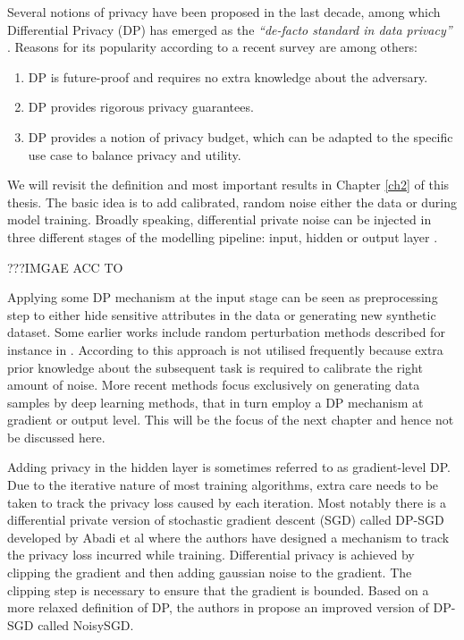 Several notions of privacy have been proposed in the last decade, among which Differential Privacy (DP) has emerged as the \textit{``de-facto standard in data privacy''} \parencite{kim2021survey}. Reasons for its popularity according to a recent survey \parencite{surv_dp2021} are among others:

\begin{enumerate}
    \item DP is future-proof and requires no extra knowledge about the adversary.
    \item DP provides rigorous privacy guarantees.
    \item DP provides a notion of privacy budget, which can be adapted to the specific use case to balance privacy and utility.
\end{enumerate}

We will revisit the definition and most important results in Chapter \ref{ch2} of this thesis. The basic idea is to add calibrated, random noise either the data or during model training. Broadly speaking, differential private noise can be injected in three different stages of the modelling pipeline: input, hidden or output layer \parencite[cf.][]{zhao2019differential}. 

???IMGAE ACC TO \parencite{wang2023differential}

Applying some DP mechanism at the input stage can be seen as preprocessing step to either hide sensitive attributes in the data or generating new synthetic dataset. Some earlier works include random perturbation methods described for instance in \parencite{input_levelDP,erm_dp_input}. According to \parencite{wang2023differential} this approach is not utilised frequently because extra prior knowledge about the subsequent task is required to calibrate the right amount of noise. More recent methods focus exclusively on generating data samples by deep learning methods, that in turn employ a DP mechanism at gradient or output level. This will be the focus of the next chapter and hence not be discussed here.

Adding privacy in the hidden layer is sometimes referred to as gradient-level DP. Due to the iterative nature of most training algorithms, extra care needs to be taken to track the privacy loss caused by each iteration. Most notably there is a differential private version of stochastic gradient descent (SGD) called DP-SGD developed by Abadi et al \parencite{Abadi_2016} where the authors have designed a mechanism to track the privacy loss incurred while training. Differential privacy is achieved by clipping the gradient and then adding gaussian noise to the gradient. The clipping step is necessary to ensure that the gradient is bounded. Based on a more relaxed definition of DP, the authors in \parencite{bu2020deep} propose an improved version of DP-SGD called NoisySGD. 

